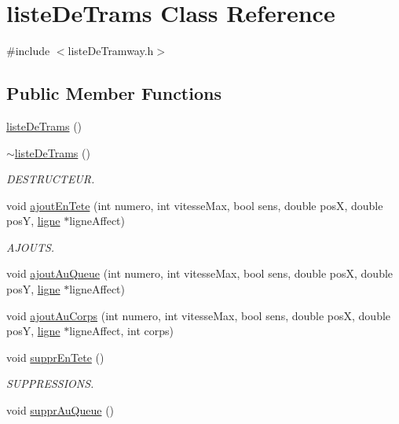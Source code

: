 \hypertarget{classliste_de_trams}{}\section{liste\+De\+Trams Class Reference}
\label{classliste_de_trams}


{\ttfamily \#include $<$liste\+De\+Tramway.\+h$>$}

\subsection*{Public Member Functions}
\begin{DoxyCompactItemize}
\item 
\hyperlink{classliste_de_trams_a63cd8796fa2fd5b877f378b1c4e8d66d}{liste\+De\+Trams} ()
\item 
\hyperlink{classliste_de_trams_ac4f850a2d93ad983b485cfa83fdcb57d}{$\sim$liste\+De\+Trams} ()
\begin{DoxyCompactList}\small\item\em D\+E\+S\+T\+R\+U\+C\+T\+E\+UR. \end{DoxyCompactList}\item 
void \hyperlink{classliste_de_trams_acc9f9a3e125a1801cfe108a4a9b27cfc}{ajout\+En\+Tete} (int numero, int vitesse\+Max, bool sens, double posX, double posY, \hyperlink{classligne}{ligne} $\ast$ligne\+Affect)
\begin{DoxyCompactList}\small\item\em A\+J\+O\+U\+TS. \end{DoxyCompactList}\item 
void \hyperlink{classliste_de_trams_af969635f70bda1d3b429a1220e649d7c}{ajout\+Au\+Queue} (int numero, int vitesse\+Max, bool sens, double posX, double posY, \hyperlink{classligne}{ligne} $\ast$ligne\+Affect)
\item 
void \hyperlink{classliste_de_trams_aae576aa98d9709644fee9dda66ea54f7}{ajout\+Au\+Corps} (int numero, int vitesse\+Max, bool sens, double posX, double posY, \hyperlink{classligne}{ligne} $\ast$ligne\+Affect, int corps)
\item 
void \hyperlink{classliste_de_trams_a495cc9d541621a18e3c10817e62d31bd}{suppr\+En\+Tete} ()
\begin{DoxyCompactList}\small\item\em S\+U\+P\+P\+R\+E\+S\+S\+I\+O\+NS. \end{DoxyCompactList}\item 
void \hyperlink{classliste_de_trams_aea83e66431a0a5ff31a631a04f3284cc}{suppr\+Au\+Queue} ()

\end{DoxyCompactItemize}
